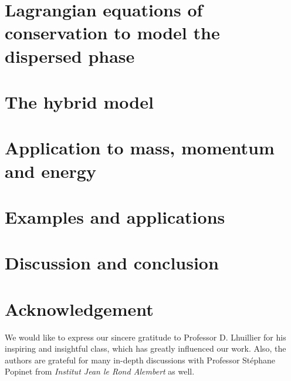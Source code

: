 \documentclass[12pt]{My_preprint}
\begin{document}
\section{Lagrangian equations of conservation to model the dispersed phase}
\label{sec:Lagrangian}


\section{The hybrid model}
\label{sec:averaged_eq}





\section{Application to mass, momentum and energy}
\label{sec:Exemples}

 


% 
% 
\section{Examples and applications}

% 



\section{Discussion and conclusion}


\section*{Acknowledgement}
We would like to express our sincere gratitude to Professor D. Lhuillier for his inspiring and insightful class, which has greatly influenced our work.
Also, the authors are grateful for many in-depth discussions with Professor St\'ephane Popinet from \textit{Institut Jean le Rond Alembert} as well. 




\appendix





\end{document}
